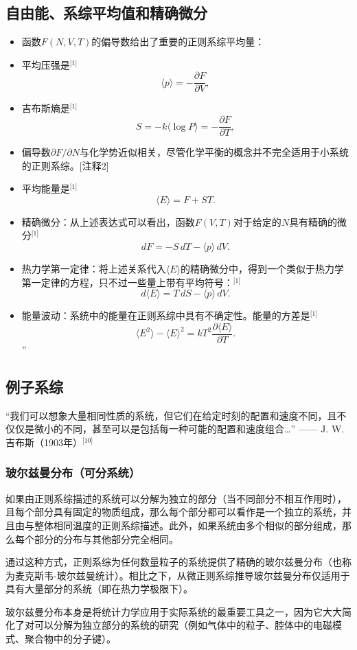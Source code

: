 \subsection{自由能、系综平均值和精确微分}  
\begin{itemize}
\item 函数\( F(N, V, T) \)的偏导数给出了重要的正则系综平均量：  
\item 平均压强是\(^\text{[1]}\)  
\[
\langle p \rangle = -\frac{\partial F}{\partial V},~
\]  
\item 吉布斯熵是\(^\text{[1]}\)  
\[
S = -k \langle \log P \rangle = -\frac{\partial F}{\partial T},~
\]  
\item 偏导数\(\partial F/\partial N\)与化学势近似相关，尽管化学平衡的概念并不完全适用于小系统的正则系综。[注释2]  
\item 平均能量是\(^\text{[1]}\)  
\[
\langle E \rangle = F + S T.~
\]  
\item 精确微分：从上述表达式可以看出，函数\( F(V, T) \)对于给定的\( N \)具有精确的微分\(^\text{[1]}\)  
\[
dF = -S \, dT - \langle p \rangle \, dV.~
\]  
\item 热力学第一定律：将上述关系代入\( \langle E \rangle \)的精确微分中，得到一个类似于热力学第一定律的方程，只不过一些量上带有平均符号：\(^\text{[1]}\)  
\[
d \langle E \rangle = T \, dS - \langle p \rangle \, dV.~
\]  
\item 能量波动：系统中的能量在正则系综中具有不确定性。能量的方差是\(^\text{[1]}\)  
\[
\langle E^2 \rangle - \langle E \rangle^2 = k T^2 \frac{\partial \langle E \rangle}{\partial T}.~
\]”
\end{itemize}
\subsection{例子系综}  
“我们可以想象大量相同性质的系统，但它们在给定时刻的配置和速度不同，且不仅仅是微小的不同，甚至可以是包括每一种可能的配置和速度组合…” —— J. W. 吉布斯（1903年）\(^\text{[10]}\) 
\subsubsection{玻尔兹曼分布（可分系统）}  
如果由正则系综描述的系统可以分解为独立的部分（当不同部分不相互作用时），且每个部分具有固定的物质组成，那么每个部分都可以看作是一个独立的系统，并且由与整体相同温度的正则系综描述。此外，如果系统由多个相似的部分组成，那么每个部分的分布与其他部分完全相同。

通过这种方式，正则系综为任何数量粒子的系统提供了精确的玻尔兹曼分布（也称为麦克斯韦-玻尔兹曼统计）。相比之下，从微正则系综推导玻尔兹曼分布仅适用于具有大量部分的系统（即在热力学极限下）。

玻尔兹曼分布本身是将统计力学应用于实际系统的最重要工具之一，因为它大大简化了对可以分解为独立部分的系统的研究（例如气体中的粒子、腔体中的电磁模式、聚合物中的分子键）。